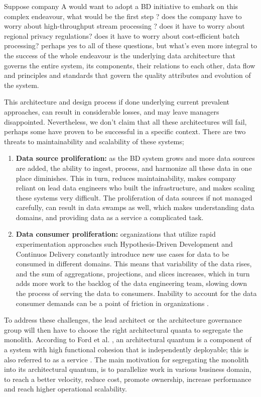 \documentclass{bmcart}
\begin{document}
Suppose company A would want to adopt a BD initiative to embark on this complex endeavour, what would be the first step ? does the company have to worry about high-throughput stream processing ? does it have to worry about regional privacy regulations? does it have to worry about cost-efficient batch processing? perhaps yes to all of these questions, but what's even more integral to the success of the whole endeavour is the underlying data architecture that governs the entire system, its components, their relations to each other, data flow and principles and standards that govern the quality attributes and evolution of the system.

This architecture and design process if done underlying current prevalent approaches, can result in considerable losses, and may leave managers disappointed. Nevertheless, we don't claim that all these architectures will fail, perhaps some have proven to be successful in a specific context. There are two threats to maintainability and scalability of these systems;

\begin{enumerate}
    \item \textbf{Data source proliferation:} as the BD system grows and more data sources are added, the ability to ingest, process, and harmonize all these data in one place diminishes. This in turn, reduces maintainability, makes company reliant on lead data engineers who built the infrastructure, and makes scaling these systems very difficult. The proliferation of data sources if not managed carefully, can result in data swamps as well, which makes understanding data domains, and providing data as a service a complicated task.
    \item \textbf{Data consumer proliferation:} organizations that utilize rapid experimentation approaches such Hypothesis-Driven Development and Continuos Delivery \cite{hypothesisDev} constantly introduce new use cases for data to be consumed in different domains. This means that variability of the data rises, and the sum of aggregations, projections, and slices increases, which in turn adds more work to the backlog of the data engineering team, slowing down the process of serving the data to consumers. Inability to account for the data consumer demands can be a point of friction in organizations \cite{monolithToMesh}. 
\end{enumerate}

To address these challenges, the lead architect or the architecture governance group will then have to choose the right architectural quanta to segregate the monolith. According to Ford et al. \cite{ford2017building}, an architectural quantum is a component of a system with high functional cohesion that is independently deployable; this is also referred to as a service \cite{newman2021building}. The main motivation for segregating the monolith into its architectural quantum, is to parallelize work in various business domain, to reach a better velocity, reduce cost, promote ownership, increase performance and reach higher operational scalability.
\end{document}
